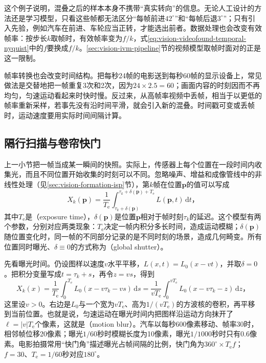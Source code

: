 这个例子说明，混叠之后的样本本身不携带“真实转向”的信息。无论人工设计的方法还是学习模型，只看这些帧都无法区分“每帧前进$42^\circ$”和“每帧后退$3^\circ$”；只有引入先验，例如汽车在前进、车轮应当正转，才能选出前者。数据处理也会改变有效帧率：按步长$k$取帧时，有效帧率变为$f/k$，式\eqref{eq:vision-videofound-temporal-nyquist}中的$f$要换成$f/k$。\ref{sec:vision-ivm-pipeline}节的视频模型取帧时面对的正是这一限制。

帧率转换也会改变时间结构。把每秒24帧的电影送到每秒60帧的显示设备上，常见做法是交替地把一帧重复3次和2次，因为$24\times2.5=60$；画面内容的时刻因而不再均匀，匀速运动看起来时快时慢。反过来，从高帧率视频中丢帧，相当于以更低的帧率重新采样，若事先没有沿时间平滑，就会引入新的混叠。时间戳可变或丢帧时，运动速度要用实际时间间隔计算。

\subsection{隔行扫描与卷帘快门}
\label{sec:vision-videofound-shutter}

上一小节把一帧当成某一瞬间的快照。实际上，传感器上每个位置在一段时间内收集光，而且不同位置开始收集的时刻可以不同。忽略噪声、增益和成像管线中的非线性处理（见\ref{sec:vision-formation-isp}节），第$k$帧在位置$\bm{p}$的值可以写成
\begin{equation}
  X_k(\bm p)=\frac{1}{T_{\mathrm e}}
  \int_{\tau_k+\delta(\bm p)}^{\tau_k+\delta(\bm p)+T_{\mathrm e}}
  L(\bm p,t)\,\mathrm{d}t\text{，}
  \label{eq:vision-videofound-exposure}
\end{equation}
其中$T_{\mathrm e}$是（exposure time），$\delta(\bm p)$是位置$\bm p$相对于帧时刻$\tau_k$的延迟。这个模型有两个参数，分别对应两类现象：$T_{\mathrm e}$决定一帧内积分多长时间，造成运动模糊；$\delta(\bm p)$随位置变化时，同一帧的不同部分记录的是不同时刻的场景，造成几何畸变。所有位置同时曝光、$\delta\equiv0$的方式称为（global shutter）。

先看曝光时间。仍设图样以速度$v$水平平移，$L(x,t)=L_0(x-vt)$，并取$\delta=0$。把积分变量写成$t=\tau_k+s$，再令$z=vs$，得到
\[
  X_k(x)=\frac{1}{T_{\mathrm e}}\int_0^{T_{\mathrm e}}L_0(x-v\tau_k-vs)\,\mathrm{d}s
  =\frac{1}{vT_{\mathrm e}}\int_0^{vT_{\mathrm e}}L_0(x-v\tau_k-z)\,\mathrm{d}z\text{，}
\]
这里设$v>0$。右边是$L_0$与一个宽为$vT_{\mathrm e}$、高为$1/(vT_{\mathrm e})$的方波核的卷积，再平移到当前位置。也就是说，匀速运动在曝光时间内把图样沿运动方向抹开了$\ell=|v|T_{\mathrm e}$个像素，这就是（motion blur）。汽车以每秒600像素移动、帧率30时，相邻帧位移20像素；曝光$1/60$秒时模糊长度为10像素，曝光$1/1000$秒时只有0.6像素。电影拍摄常用“快门角”描述曝光占帧间隔的比例，快门角为$360^\circ\times T_{\mathrm e}f$；$f=30$、$T_{\mathrm e}=1/60$秒对应$180^\circ$。

